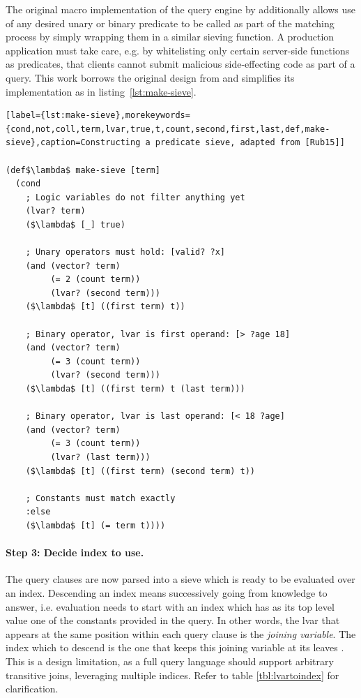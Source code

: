 The original macro implementation of the query engine by \cite{rubin15aosadb} additionally allows use of any desired unary or binary predicate to be called as part of the matching process by simply wrapping them in a similar sieving function. A production application must take care, e.g. by whitelisting only certain server-side functions as predicates, that clients cannot submit malicious side-effecting code as part of a query. This work borrows the original design from \cite{rubin15aosadb} and simplifies its implementation as in listing~\ref{lst:make-sieve}.


\begin{lstlisting}[label={lst:make-sieve},morekeywords={cond,not,coll,term,lvar,true,t,count,second,first,last,def,make-sieve},caption=Constructing a predicate sieve, adapted from [Rub15]]

(def$\lambda$ make-sieve [term]
  (cond
    ; Logic variables do not filter anything yet
    (lvar? term)
    ($\lambda$ [_] true)

    ; Unary operators must hold: [valid? ?x]
    (and (vector? term)
         (= 2 (count term))
         (lvar? (second term)))
    ($\lambda$ [t] ((first term) t))

    ; Binary operator, lvar is first operand: [> ?age 18]
    (and (vector? term)
         (= 3 (count term))
         (lvar? (second term)))
    ($\lambda$ [t] ((first term) t (last term)))

    ; Binary operator, lvar is last operand: [< 18 ?age]
    (and (vector? term)
         (= 3 (count term))
         (lvar? (last term)))
    ($\lambda$ [t] ((first term) (second term) t))

    ; Constants must match exactly
    :else
    ($\lambda$ [t] (= term t))))

\end{lstlisting}


\cleardoublepage
\paragraph{Step 3: Decide index to use.}
The query clauses are now parsed into a sieve which is ready to be evaluated over an index. Descending an index means successively going from knowledge to answer, i.e. evaluation needs to start with an index which has as its top level value one of the constants provided in the query. In other words, the lvar that appears at the same position within each query clause is the \emph{joining variable}. The index which to descend is the one that keeps this joining variable at its leaves \cite{rubin15aosadb}. This is a design limitation, as a full query language should support arbitrary transitive joins, leveraging multiple indices. Refer to table \ref{tbl:lvartoindex} for clarification.

